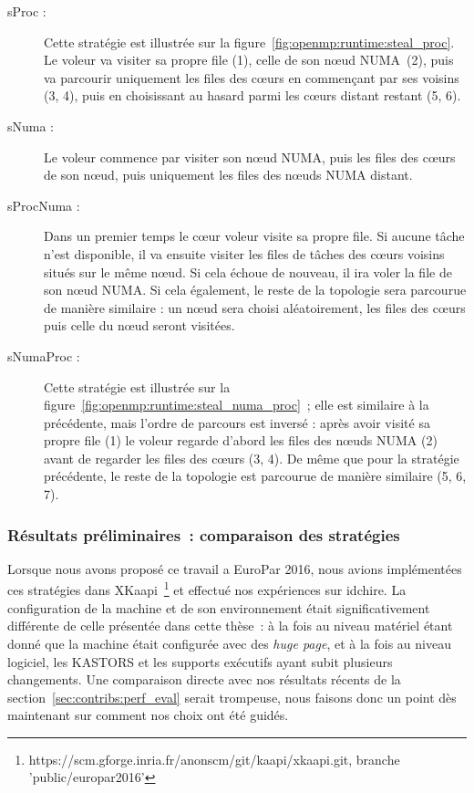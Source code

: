 \begin{description}
  \item [sProc :] Cette stratégie est illustrée sur la figure~\ref{fig:openmp:runtime:steal_proc}. Le voleur va visiter sa propre file (1), celle de son nœud NUMA (2), puis va parcourir uniquement les files des cœurs en commençant par ses voisins (3, 4), puis en choisissant au hasard parmi les cœurs distant restant (5, 6).
  \item [sNuma :] Le voleur commence par visiter son nœud NUMA, puis les files des cœurs de son nœud, puis uniquement les files des nœuds NUMA distant.
  \item [sProcNuma :] Dans un premier temps le cœur voleur visite sa propre file. Si aucune tâche n'est disponible, il va ensuite visiter les files de tâches des cœurs voisins situés sur le même nœud.
    Si cela échoue de nouveau, il ira voler la file de son nœud NUMA.
    Si cela également, le reste de la topologie sera parcourue de manière similaire : un nœud sera choisi aléatoirement, les files des cœurs puis celle du nœud seront visitées.
  \item [sNumaProc :] Cette stratégie est illustrée sur la figure~\ref{fig:openmp:runtime:steal_numa_proc}~; elle est similaire à la précédente, mais l'ordre de parcours est inversé : après avoir visité sa propre file (1) le voleur regarde d'abord les files des nœuds NUMA (2) avant de regarder les files des cœurs (3, 4). De même que pour la stratégie précédente, le reste de la topologie est parcourue de manière similaire (5, 6, 7).
\end{description}

\subsubsection{Résultats préliminaires~: comparaison des stratégies}
\label{sec:openmp:runtime:preliminary_results}

Lorsque nous avons proposé ce travail a EuroPar 2016, nous avions implémentées ces stratégies dans XKaapi~\footnote{https://scm.gforge.inria.fr/anonscm/git/kaapi/xkaapi.git, branche 'public/europar2016'} et effectué nos expériences sur idchire.
La configuration de la machine et de son environnement était significativement différente de celle présentée dans cette thèse~: à la fois au niveau matériel étant donné que la machine était configurée avec des \emph{huge page}, et à la fois au niveau logiciel, les KASTORS et les supports exécutifs ayant subit plusieurs changements.
Une comparaison directe avec nos résultats récents de la section~\ref{sec:contribs:perf_eval} serait trompeuse, nous faisons donc un point dès maintenant sur comment nos choix ont été guidés.

